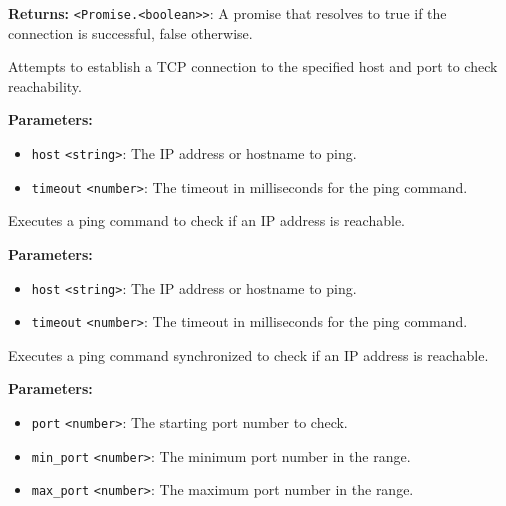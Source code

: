 \documentclass[12pt,a4paper]{article}
\begin{document}
\noindent \textbf{Returns:} \texttt{<Promise.<boolean>>}: A promise that resolves to \textasciigrave{}true\textasciigrave{} if the connection is successful, \textasciigrave{}false\textasciigrave{} otherwise.

\noindent Attempts to establish a TCP connection to the specified host and port to check reachability.

\vspace{5mm}
\noindent {}


\noindent \textbf{Parameters:}
\begin{itemize}
  \item \texttt{host} \texttt{<string>}: The IP address or hostname to ping.
  \item \texttt{timeout} \texttt{<number>}: The timeout in milliseconds for the ping command.
\end{itemize}

\noindent Executes a ping command to check if an IP address is reachable.

\vspace{5mm}
\noindent {}


\noindent \textbf{Parameters:}
\begin{itemize}
  \item \texttt{host} \texttt{<string>}: The IP address or hostname to ping.
  \item \texttt{timeout} \texttt{<number>}: The timeout in milliseconds for the ping command.
\end{itemize}

\noindent Executes a ping command synchronized to check if an IP address is reachable.

\vspace{5mm}
\noindent {}


\noindent \textbf{Parameters:}
\begin{itemize}
  \item \texttt{port} \texttt{<number>}: The starting port number to check.
  \item \texttt{min\_port} \texttt{<number>}: The minimum port number in the range.
  \item \texttt{max\_port} \texttt{<number>}: The maximum port number in the range.
\end{itemize}
\end{document}
